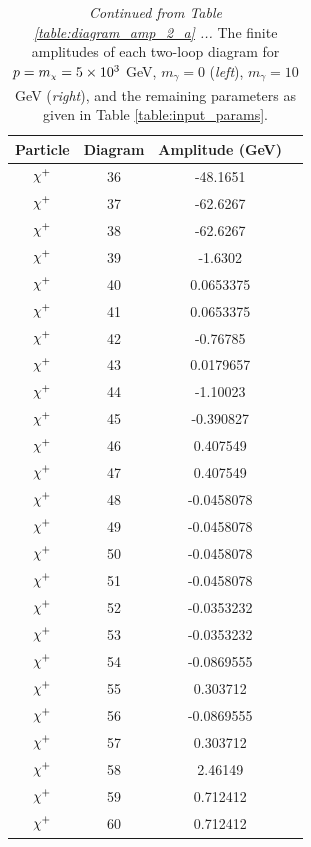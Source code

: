 \documentclass[11pt]{article}
\newcommand{\mychi}{\raisebox{0pt}[1ex][1ex]{\tiny$\chi$}}
\newcommand{\mychibig}{\raisebox{0pt}[1ex][1ex]{$\chi$}}
\def\mc{m_{\mychi}}
\begin{document}
\begin{table}[h!]
\begin{tabular}{c c c c}
\hline\end{tabular}
\end{table}



\begin{table}[h!]
\caption{\textit{Continued from Table \ref{table:diagram_amp_2_a} ... } The finite amplitudes of each two-loop diagram for $p=\mc=5\times10^3$ GeV, $m_{\gamma}=0$ (\textit{left}), $m_{\gamma}=10$ GeV (\textit{right}), and the remaining parameters as given in Table \ref{table:input_params}.}\label{table:diagram_amp_2_b}
\centering
\vspace{0.2cm}
\begin{tabular}{c c c c}
Particle & Diagram & Amplitude (GeV) \\
\hline
$\mychibig^+$ & 36 & -48.1651 \\ 
$\mychibig^+$ & 37 & -62.6267 \\ 
$\mychibig^+$ & 38 & -62.6267 \\ 
$\mychibig^+$ & 39 & -1.6302 \\ 
$\mychibig^+$ & 40 & 0.0653375 \\ 
$\mychibig^+$ & 41 & 0.0653375 \\ 
$\mychibig^+$ & 42 & -0.76785 \\ 
$\mychibig^+$ & 43 & 0.0179657 \\ 
$\mychibig^+$ & 44 & -1.10023 \\ 
$\mychibig^+$ & 45 & -0.390827 \\ 
$\mychibig^+$ & 46 & 0.407549 \\ 
$\mychibig^+$ & 47 & 0.407549 \\ 
$\mychibig^+$ & 48 & -0.0458078 \\ 
$\mychibig^+$ & 49 & -0.0458078 \\ 
$\mychibig^+$ & 50 & -0.0458078 \\ 
$\mychibig^+$ & 51 & -0.0458078 \\ 
$\mychibig^+$ & 52 & -0.0353232 \\ 
$\mychibig^+$ & 53 & -0.0353232 \\ 
$\mychibig^+$ & 54 & -0.0869555 \\ 
$\mychibig^+$ & 55 & 0.303712 \\ 
$\mychibig^+$ & 56 & -0.0869555 \\ 
$\mychibig^+$ & 57 & 0.303712 \\ 
$\mychibig^+$ & 58 & 2.46149 \\ 
$\mychibig^+$ & 59 & 0.712412 \\ 
$\mychibig^+$ & 60 & 0.712412 \\ 

\end{tabular}
\end{table}
\end{document}
